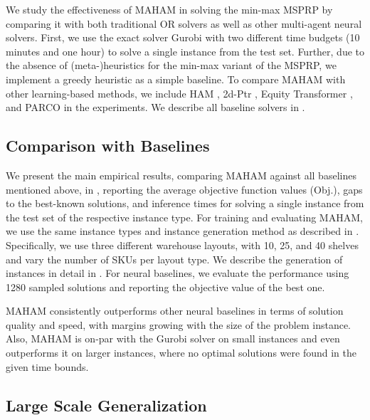 
\label{sec:exp}

We study the effectiveness of MAHAM in solving the min-max MSPRP by comparing it with both traditional OR solvers as well as other multi-agent neural solvers. First, we use the exact solver Gurobi with two different time budgets (10 minutes and one hour) to solve a single instance from the test set. Further, due to the absence of (meta-)heuristics for the min-max variant of the MSPRP, we implement a greedy heuristic as a simple baseline. To compare MAHAM with other learning-based methods, we include HAM \cite{luttmann2024neural}, 2d-Ptr \cite{liu20242d}, Equity Transformer \cite{son2024equity}, and PARCO \cite{berto2024parco} in the experiments.  We describe all baseline solvers in . 




\subsection{Comparison with Baselines}

We present the main empirical results, comparing MAHAM against all baselines mentioned above, in , reporting the average objective function values (Obj.), gaps to the best-known solutions, and inference times for solving a single instance from the test set of the respective instance type. For training and evaluating MAHAM, we use the same instance types and instance generation method as described in \cite{luttmann2024neural}. Specifically, we use three different warehouse layouts, with 10, 25, and 40 shelves and vary the number of SKUs per layout type. We describe the generation of instances in detail in . For neural baselines, we evaluate the performance using 1280 sampled solutions and reporting the objective value of the best one. 

MAHAM consistently outperforms other neural baselines in terms of solution quality and speed, with margins growing with the size of the problem instance. Also, MAHAM is on-par with the Gurobi solver on small instances and even outperforms it on larger instances, where no optimal solutions were found in the given time bounds.


\subsection{Large Scale Generalization}


